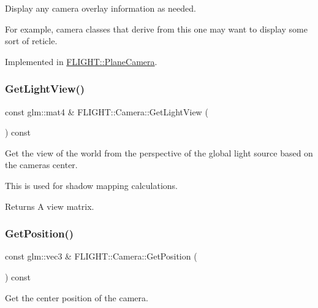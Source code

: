 Display any camera overlay information as needed. 

For example, camera classes that derive from this one may want to display some sort of reticle. 

Implemented in \hyperlink{class_f_l_i_g_h_t_1_1_plane_camera_af30e27a90e880803572bc66547827d03}{F\+L\+I\+G\+H\+T\+::\+Plane\+Camera}.

\mbox{\label{class_f_l_i_g_h_t_1_1_camera_a02fc66e5e6430b3471009c1b74f087b8}} 
\subsubsection{\texorpdfstring{Get\+Light\+View()}{GetLightView()}}
{\footnotesize\ttfamily const glm\+::mat4 \& F\+L\+I\+G\+H\+T\+::\+Camera\+::\+Get\+Light\+View (\begin{DoxyParamCaption}{ }\end{DoxyParamCaption}) const}



Get the view of the world from the perspective of the global light source based on the camera\textquotesingle{}s center. 

This is used for shadow mapping calculations. \begin{DoxyReturn}{Returns}
A view matrix. 
\end{DoxyReturn}
\mbox{\label{class_f_l_i_g_h_t_1_1_camera_ac29531b049cf048aeb0470a45361fc99}} 
\subsubsection{\texorpdfstring{Get\+Position()}{GetPosition()}}
{\footnotesize\ttfamily const glm\+::vec3 \& F\+L\+I\+G\+H\+T\+::\+Camera\+::\+Get\+Position (\begin{DoxyParamCaption}{ }\end{DoxyParamCaption}) const}



Get the center position of the camera. 

